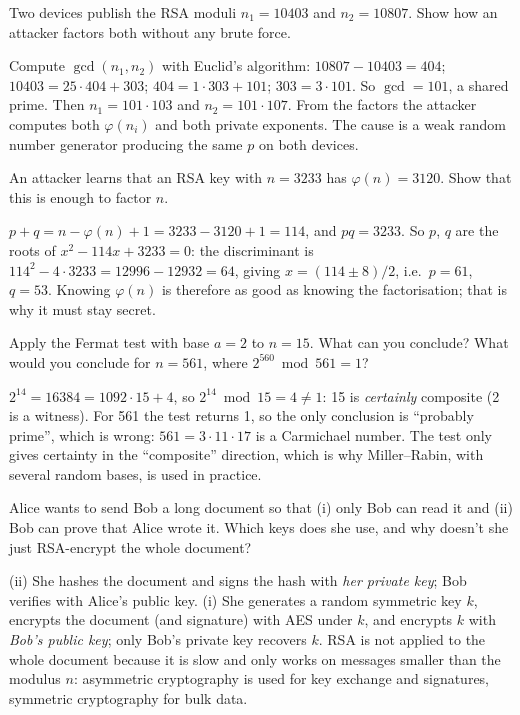 \begin{exercise}
Two devices publish the RSA moduli $n_1 = 10403$ and $n_2 = 10807$. Show how an attacker factors both without any brute force.
\end{exercise}
\begin{solution}
Compute $\gcd(n_1, n_2)$ with Euclid's algorithm: $10807 - 10403 = 404$; $10403 = 25 \cdot 404 + 303$; $404 = 1 \cdot 303 + 101$; $303 = 3 \cdot 101$. So $\gcd = 101$, a shared prime. Then $n_1 = 101 \cdot 103$ and $n_2 = 101 \cdot 107$. From the factors the attacker computes both $\varphi(n_i)$ and both private exponents. The cause is a weak random number generator producing the same $p$ on both devices.
\end{solution}

\begin{exercise}
An attacker learns that an RSA key with $n = 3233$ has $\varphi(n) = 3120$. Show that this is enough to factor $n$.
\end{exercise}
\begin{solution}
$p + q = n - \varphi(n) + 1 = 3233 - 3120 + 1 = 114$, and $pq = 3233$. So $p$, $q$ are the roots of $x^2 - 114x + 3233 = 0$: the discriminant is $114^2 - 4 \cdot 3233 = 12996 - 12932 = 64$, giving $x = (114 \pm 8)/2$, i.e.\ $p = 61$, $q = 53$. Knowing $\varphi(n)$ is therefore as good as knowing the factorisation; that is why it must stay secret.
\end{solution}

\begin{exercise}
Apply the Fermat test with base $a = 2$ to $n = 15$. What can you conclude? What would you conclude for $n = 561$, where $2^{560} \bmod 561 = 1$?
\end{exercise}
\begin{solution}
$2^{14} = 16384 = 1092 \cdot 15 + 4$, so $2^{14} \bmod 15 = 4 \neq 1$: 15 is \emph{certainly} composite (2 is a witness). For 561 the test returns 1, so the only conclusion is \enquote{probably prime}, which is wrong: $561 = 3 \cdot 11 \cdot 17$ is a Carmichael number. The test only gives certainty in the \enquote{composite} direction, which is why Miller--Rabin, with several random bases, is used in practice.
\end{solution}

\begin{exercise}
Alice wants to send Bob a long document so that (i) only Bob can read it and (ii) Bob can prove that Alice wrote it. Which keys does she use, and why doesn't she just RSA-encrypt the whole document?
\end{exercise}
\begin{solution}
(ii) She hashes the document and signs the hash with \emph{her private key}; Bob verifies with Alice's public key. (i) She generates a random symmetric key $k$, encrypts the document (and signature) with AES under $k$, and encrypts $k$ with \emph{Bob's public key}; only Bob's private key recovers $k$. RSA is not applied to the whole document because it is slow and only works on messages smaller than the modulus $n$: asymmetric cryptography is used for key exchange and signatures, symmetric cryptography for bulk data.
\end{solution}

